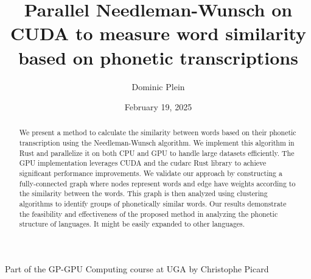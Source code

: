 \documentclass[10pt,a4paper,english]{article}
\title{\vspace{-0.0em}Parallel Needleman-Wunsch on CUDA to measure word similarity based on phonetic transcriptions}
\author{Dominic Plein}
\date{February 19, 2025}
\newcommand{\abstractText}{\noindent
	\newline\noindent
    We present a method to calculate the similarity between words based on their phonetic transcription using the Needleman-Wunsch algorithm. We implement this algorithm in Rust and parallelize it on both CPU and GPU to handle large datasets efficiently. The GPU implementation leverages CUDA and the cudarc Rust library to achieve significant performance improvements. We validate our approach by constructing a fully-connected graph where nodes represent words and edge have weights according to the similarity between the words. This graph is then analyzed using clustering algorithms to identify groups of phonetically similar words. Our results demonstrate the feasibility and effectiveness of the proposed method in analyzing the phonetic structure of languages. It might be easily expanded to other languages.
}
\begin{document}
\setlength{\abovedisplayskip}{0.2em}

\maketitle
\begin{center}
    \small{Part of the GP-GPU Computing course at UGA by Christophe Picard}
\end{center}

\vspace{1em}
\begin{abstract}
    \abstractText
    \newline
    \newline
\end{abstract}



\begin{multicols*}{2}
\tableofcontents

\newcolumn


\vfill\null
\columnbreak



\end{multicols*}

\printglossary[type=\acronymtype]

\printbibliography[
    heading=bibintoc,
    title={Bibliography},
    keyword={lit}
]
\printbibliography[
    title={Data sources},
    keyword={data}
]
\end{document}
